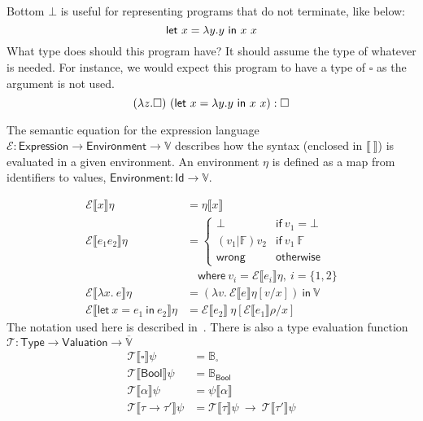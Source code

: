 Bottom $\bot$ is useful for representing programs that do not terminate,
like below:
\[\mathsf{let} \ x = \lambda y. y \ \mathsf{in} \ x \ x\]
What type does should this program have? It should assume the
type of whatever is needed. For instance, we would expect this program
to have a type of $\square$ as the argument is not used.
\[ (\lambda z. \square) \ (\mathsf{let} \ x = \lambda y. y \ \mathsf{in} \ x \ x) : \square \]

The semantic equation for the expression language
${\mathcal{E} : \mathsf{Expression} \rightarrow \mathsf{Environment} \rightarrow
\mathbb{V}}$ describes how the syntax (enclosed in $\llbracket\ \rrbracket$) is evaluated in a given
environment.
An environment $\eta$ is defined as a map from identifiers to values,
${\mathsf{Environment} : \mathsf{Id} \rightarrow \mathbb{V}}$.

\begin{align*}
  \mathcal{E} \llbracket x \rrbracket \eta
  &= \eta \llbracket x \rrbracket \\
  \mathcal{E} \llbracket e_1 e_2 \rrbracket \eta
  &=
    \begin{cases}
      \bot & \mathsf{if} \ v_1 = \bot \\
      (v_1 | \mathbb{F}) v_2 & \mathsf{if} \ v_1 \ \mathbb{F} \\
      \mathsf{wrong} & \mathsf{otherwise}
    \end{cases}
  \\
  & \quad \textsf{where} \ v_i = \mathcal{E} \llbracket e_i \rrbracket \eta , \ i = \{
    1, 2\} \\
  \mathcal{E} \llbracket \lambda x . \ e \rrbracket \eta
  &=
    (\lambda v . \ \mathcal{E} \llbracket e \rrbracket \eta [v / x ])
    \ \mathsf{in} \ \mathbb{V} \\
  \mathcal{E} \llbracket \textsf{let} \ x = e_1 \ \textsf{in} \ e_2 \rrbracket \eta
  &=
    \mathcal{E} \llbracket e_2 \rrbracket \ \eta [ \mathcal{E} \llbracket e_1 \rrbracket\rho / x ]
\end{align*}
The notation used here is described in~\cite{milner1978,damas1984}.
There is also a type evaluation function $\mathcal{T} : \mathsf{Type}
\rightarrow \mathsf{Valuation} \rightarrow \overline{\mathbb{V}}$
\begin{align*}
  \mathcal{T}\llbracket \square \rrbracket\psi &= \mathbb{B}_{ \square } \\
  \mathcal{T}\llbracket \mathsf{Bool} \rrbracket \psi &= \mathbb{B}_{\mathsf{Bool}} \\
  \mathcal{T}\llbracket \alpha \rrbracket \psi &= \psi \llbracket \alpha \rrbracket \\
  \mathcal{T} \llbracket \tau \rightarrow \tau' \rrbracket \psi &= \mathcal{T}\llbracket \tau \rrbracket \psi \ \rightarrow \
                             \mathcal{T} \llbracket \tau' \rrbracket \psi
\end{align*}
